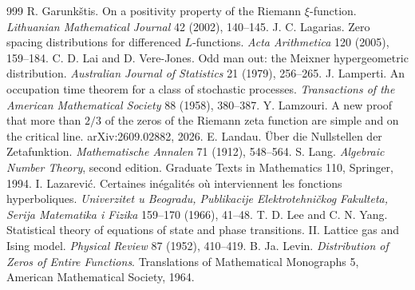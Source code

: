 \begin{thebibliography}{999}
 R. Garunk\v{s}tis. On a positivity property of the Riemann $\xi$-function. \emph{Lithuanian Mathematical Journal} 42 (2002), 140--145. %
 J. C. Lagarias. Zero spacing distributions for differenced $L$-functions. \emph{Acta Arithmetica} 120 (2005), 159--184.
 C. D. Lai and D. Vere-Jones. Odd man out: the Meixner hypergeometric distribution. \emph{Australian Journal of Statistics} 21 (1979), 256--265.
 J. Lamperti. An occupation time theorem for a class of stochastic processes. \emph{Transactions of the American Mathematical Society} 88 (1958), 380--387.
 Y. Lamzouri. A new proof that more than $2/3$ of the zeros of the Riemann zeta function are simple and on the critical line. arXiv:2609.02882, 2026.
 E. Landau. \"Uber die Nullstellen der Zetafunktion. \emph{Mathematische Annalen} 71 (1912), 548--564.
 S. Lang. \emph{Algebraic Number Theory}, second edition. Graduate Texts in Mathematics 110, Springer, 1994.
 I. Lazarevi\'c. Certaines in\'egalit\'es o\`u interviennent les fonctions hyperboliques. \emph{Univerzitet u Beogradu, Publikacije Elektrotehni\v{c}kog Fakulteta, Serija Matematika i Fizika} 159--170 (1966), 41--48.
 T. D. Lee and C. N. Yang. Statistical theory of equations of state and phase transitions. II. Lattice gas and Ising model. \emph{Physical Review} 87 (1952), 410--419.
 B. Ja. Levin. \emph{Distribution of Zeros of Entire Functions}. Translations of Mathematical Monographs 5, American Mathematical Society, 1964.

\end{thebibliography}
